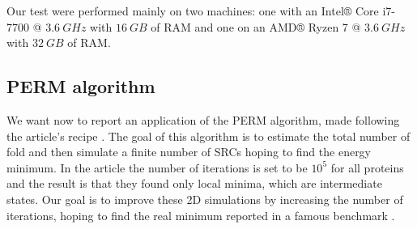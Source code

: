 Our test were performed mainly on two machines: one with an Intel® Core i7-7700 @ $3.6 \ GHz$ with $16 \ GB$ of RAM and one on an AMD® Ryzen 7 @ $3.6 \ GHz$ with $32 \ GB$ of RAM.
\subsection{PERM algorithm}
We want now to report an application of the PERM algorithm, made following the article's recipe \cite{PERM}.
The goal of this algorithm is to estimate the total number of fold and then simulate a finite number of SRCs hoping to find the energy minimum.
In the article the number of iterations is set to be $10^5$ for all proteins and the result is that they found only local minima, which are intermediate states.
Our goal is to improve these 2D simulations by increasing the number of iterations, hoping to find the real minimum reported in a famous benchmark \cite{bench}.

